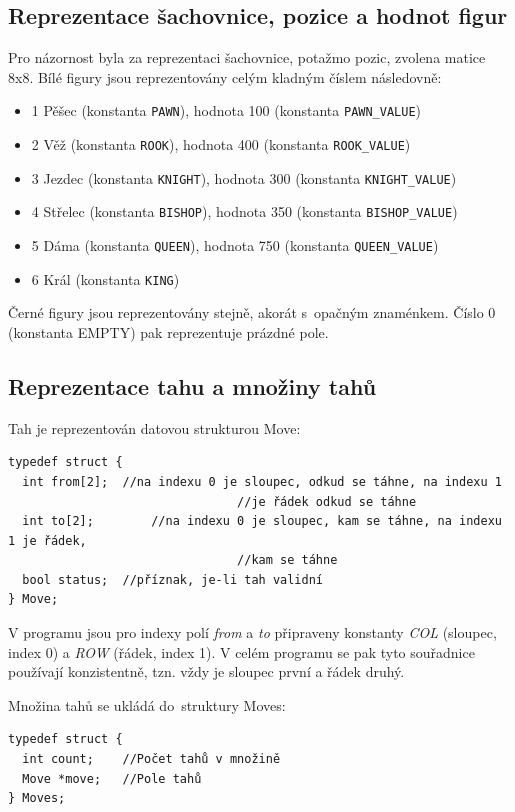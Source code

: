 \documentclass[11pt, titlepage]{article}
\begin{document}
\subsection{Reprezentace šachovnice, pozice a hodnot figur}
Pro názornost byla za reprezentaci šachovnice, potažmo pozic, zvolena matice 8x8. Bílé figury jsou reprezentovány celým kladným číslem následovně:
\begin{itemize}
	\item 1 Pěšec (konstanta {\tt PAWN}), hodnota 100 (konstanta {\tt PAWN\_VALUE})
	\item 2 Věž (konstanta {\tt ROOK}), hodnota 400 (konstanta {\tt ROOK\_VALUE})
	\item 3 Jezdec (konstanta {\tt KNIGHT}), hodnota 300 (konstanta {\tt KNIGHT\_VALUE})
	\item 4 Střelec (konstanta {\tt BISHOP}), hodnota 350 (konstanta {\tt BISHOP\_VALUE})
	\item 5 Dáma (konstanta {\tt QUEEN}), hodnota 750 (konstanta {\tt QUEEN\_VALUE})
	\item 6 Král (konstanta {\tt KING})
\end{itemize}
Černé figury jsou reprezentovány stejně, akorát s~opačným znaménkem. Číslo 0 (konstanta EMPTY) pak reprezentuje prázdné pole.

\subsection{Reprezentace tahu a množiny tahů}

Tah je reprezentován datovou strukturou Move:
\begin{verbatim}
typedef struct {
  int from[2];	//na indexu 0 je sloupec, odkud se táhne, na indexu 1 
								//je řádek odkud se táhne
  int to[2];		//na indexu 0 je sloupec, kam se táhne, na indexu 1 je řádek, 
								//kam se táhne
  bool status;	//příznak, je-li tah validní
} Move;
\end{verbatim}

V programu jsou pro indexy polí {\it from} a {\it to} připraveny konstanty {\it COL} (sloupec, index 0) a {\it ROW} (řádek, index 1). V celém programu se pak tyto souřadnice používají konzistentně, tzn. vždy je sloupec první a řádek druhý.

Množina tahů se ukládá do~struktury Moves:
\begin{verbatim}
typedef struct {
  int count;	//Počet tahů v množině
  Move *move;	//Pole tahů
} Moves;
\end{verbatim}
\end{document}
